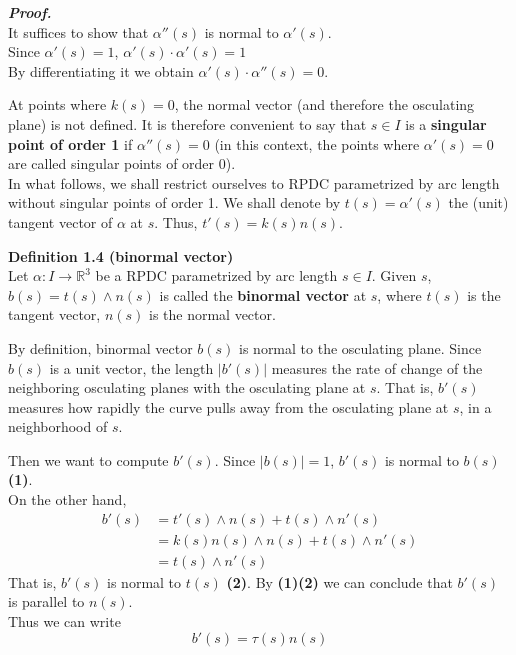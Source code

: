 \documentclass{article}
\begin{document}
\par
\textbf{\textit{Proof.}}\\
It suffices to show that $\alpha''(s)$ is normal to $\alpha'(s)$.\\
Since $\alpha'(s) = 1$, $\alpha'(s) \cdot \alpha'(s) = 1$\\
By differentiating it we obtain $\alpha'(s) \cdot \alpha''(s) = 0$.

\par
At points where $k(s) = 0$, the normal vector (and therefore the osculating plane) is not defined. It is
therefore convenient to say that $s \in I$ is a \textbf{singular point of order 1} if $\alpha''(s) = 0$ 
(in this context, the points where $\alpha'(s) = 0$ are called singular points of order 0).\\
In what follows, we shall restrict ourselves to RPDC parametrized by arc length without singular points
of order 1. We shall denote by $t(s) = \alpha'(s)$ the (unit) tangent vector of $\alpha$ at $s$. Thus,
$t'(s) = k(s)n(s)$.

\par
\textbf{Definition 1.4 (binormal vector)}\\
Let $\alpha: I \to \mathbb R^3$ be a RPDC parametrized by arc length $s \in I$. Given $s$, 
$b(s) = t(s) \land n(s)$ is called the \textbf{binormal vector} at $s$, where $t(s)$ is the tangent vector, 
$n(s)$ is the normal vector. 

\par
By definition, binormal vector $b(s)$ is normal to the osculating plane. Since $b(s)$ is a unit vector,
the length $|b'(s)|$ measures the rate of change of the neighboring osculating planes with the osculating
plane at $s$. That is, $b'(s)$ measures how rapidly the curve pulls away from the osculating plane at $s$,
in a neighborhood of $s$.

\par
Then we want to compute $b'(s)$. Since $|b(s)| = 1$, $b'(s)$ is normal to $b(s)$ \textbf{(1)}. \\
On the other hand,
$$
\begin{aligned}
    b'(s) &= t'(s) \land n(s) + t(s) \land n'(s) \\ &= k(s)n(s) \land n(s) + t(s) \land n'(s) \\ &= t(s) \land n'(s)
\end{aligned}
$$
That is, $b'(s)$ is normal to $t(s)$ \textbf{(2)}. By \textbf{(1)(2)} we can conclude that $b'(s)$ is parallel to 
$n(s)$.\\
Thus we can write 
$$
    b'(s) = \tau (s)n(s)
$$
\end{document}
